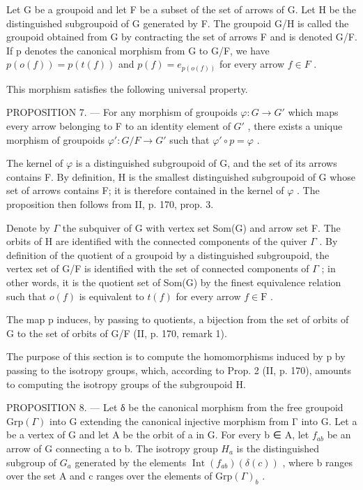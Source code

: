 Let G be a groupoid and let F be a subset of the set of arrows of G. Let H be the distinguished subgroupoid of G generated by F. The groupoid G/H is called the groupoid obtained from G by contracting the set of arrows F and is denoted G/F. If p denotes the canonical morphism from G to G/F, we have \(p(o(f)) = p(t(f))\) and \(p(f) = e_{p(o(f))}\) for every arrow \(f \in F\) .

This morphism satisfies the following universal property.

PROPOSITION 7. --- For any morphism of groupoids \(\varphi\colon G\to G'\) which maps every arrow belonging to F to an identity element of \(G'\) , there exists a unique morphism of groupoids \(\varphi'\colon G/F\to G'\) such that \(\varphi'\circ p=\varphi\) .

The kernel of \(\varphi\) is a distinguished subgroupoid of G, and the set of its arrows contains F. By definition, H is the smallest distinguished subgroupoid of G whose set of arrows contains F; it is therefore contained in the kernel of \(\varphi\) . The proposition then follows from II, p. 170, prop. 3.

Denote by \(\Gamma\) the subquiver of G with vertex set Som(G) and arrow set F. The orbits of H are identified with the connected components of the quiver \(\Gamma\) . By definition of the quotient of a groupoid by a distinguished subgroupoid, the vertex set of G/F is identified with the set of connected components of \(\Gamma\) ; in other words, it is the quotient set of Som(G) by the finest equivalence relation such that \(o(f)\) is equivalent to \(t(f)\) for every arrow \(f \in \mathrm{F}\) .

The map p induces, by passing to quotients, a bijection from the set of orbits of G to the set of orbits of G/F (II, p. 170, remark 1).

The purpose of this section is to compute the homomorphisms induced by p by passing to the isotropy groups, which, according to Prop. 2 (II, p. 170), amounts to computing the isotropy groups of the subgroupoid H.

PROPOSITION 8. --- Let δ be the canonical morphism from the free groupoid \(\mathrm{Grp}(\Gamma)\) into G extending the canonical injective morphism from Γ into G. Let a be a vertex of G and let A be the orbit of a in G. For every b ∈ A, let \(f_{ab}\) be an arrow of G connecting a to b. The isotropy group \(H_{a}\) is the distinguished subgroup of \(G_{a}\) generated by the elements \(\operatorname{Int}(f_{ab})(\delta(c))\) , where b ranges over the set A and c ranges over the elements of \(\mathrm{Grp}(\Gamma)_{b}\) .

